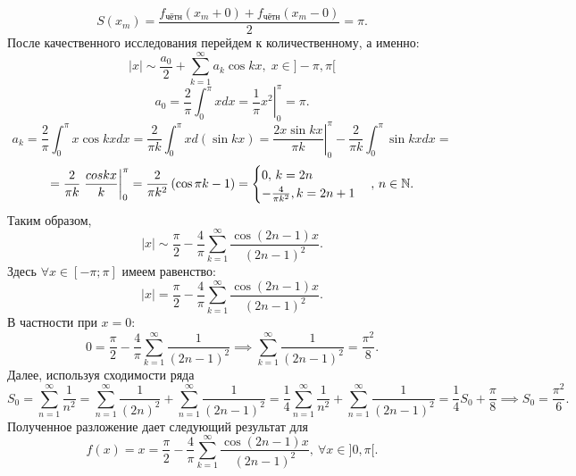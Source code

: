 \documentclass[../../main.tex]{subfiles}
\begin{document}
\begin{examples}
\begin{enumerate}
				\[
					S(x_m) = \frac{f_{\text{чётн}}(x_m+0)+ f_{\text{чётн}}(x_m-0)}{2} = \pi.
				\]
				После качественного исследования перейдем к количественному, а именно:
				\[
					|x| \sim \frac{a_0}{2} + \sum_{k=1}^{\infty}  a_k \cos k x, \; x \in ]-\pi, \pi[
				\]
				\[
					a_0 = \frac{2}{\pi} \int_{0}^{\pi}xdx = \left. \frac{1}{\pi} x^2 \right|_0^{\pi} = \pi.
				\]
				\[
					a_k = \frac{2}{\pi} \int_{0}^{\pi}x \cos kx dx = 
					\frac{2}{\pi k } \int_{0}^{\pi}x d (\sin kx) = 
					\left. \frac{2x \sin kx}{\pi k}\right|_0^{\pi} - \frac{2}{\pi k} \int_{0}^{\pi}\sin kx dx =  
				\]
				\[
				 = \frac{2}{\pi k} \left. \frac{cos k x}{k} \right|_0^{\pi} =
				 \frac{2}{\pi k^2} \left( \cos \pi k - 1 \right) = 
				 \begin{cases}
				 0, \, k = 2n \\
				 -\frac{4}{\pi k^2}, k = 2n+1
				 \end{cases}, \, n \in \mathbb{N}.
				\]
				Таким образом,
				\[
					|x| \sim \frac{\pi}{2} - \frac{4}{\pi} \sum_{k=1}^{\infty}\frac{\cos(2n-1)x}{(2n-1)^2}.
				\]
				Здесь $\forall x \in [-\pi; \pi]$ имеем равенство:
				\[
					|x| = \frac{\pi}{2} - \frac{4}{\pi} \sum_{k=1}^{\infty}\frac{\cos(2n-1)x}{(2n-1)^2}.
				\]
				В частности при $x = 0:$
				\[
					0 = \frac{\pi}{2} - \frac{4}{\pi} \sum_{k=1}^{\infty}\frac{1}{(2n-1)^2} \implies  \sum_{k=1}^{\infty}\frac{1}{(2n-1)^2} = \frac{\pi^2}{8}.
				\]
				Далее, используя сходимости ряда
				\[
					S_0 = \sum_{n=1}^{\infty} \frac{1}{n^2} = \sum_{n=1}^{\infty} \frac{1}{(2n)^2}  + \sum_{n=1}^{\infty} \frac{1}{(2n-1)^2} = 
					\frac{1}{4} \sum_{n=1}^{\infty} \frac{1}{n^2} +  \sum_{n=1}^{\infty} \frac{1}{(2n-1)^2} =
					\frac{1}{4}S_0 + \frac{\pi}{8} \implies S_0 = \frac{\pi^2}{6}.
				\]
				Полученное разложение дает следующий результат для 
				\[
					f(x) = x = \frac{\pi}{2} - \frac{4}{\pi} \sum_{k=1}^{\infty}\frac{\cos(2n-1)x}{(2n-1)^2}, \ \forall x \in ]0, \pi[.
				\]
			\end{enumerate}
		\end{examples}
\end{document}
